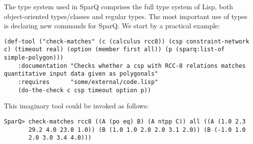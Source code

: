 \documentclass[headsepline]{scrreprt}
\theoremstyle{definition}
\newcommand{\engine}{SparQ}
\begin{document}
The type system used in \engine{} comprises the full type system of Lisp, both object-oriented types/classes and regular types. The most important use of types is declaring new commands for \engine{}. We start by a practical example:

\begin{lstlisting}
(def-tool ("check-matches" (c (calculus rcc8)) (csp constraint-network c) (timeout real) (option (member first all)) (p (sparq:list-of simple-polygon)))
    :documentation "Checks whether a csp with RCC-8 relations matches quantitative input data given as polygonals"
    :requires      "some/external/code.lisp"
    (do-the-check c csp timeout option p))
\end{lstlisting}

This imaginary tool could be invoked as follows:
\begin{verbatim}
SparQ> check-matches rcc8 ((A (po eq) B) (A ntpp C)) all ((A (1.0 2.3 
       29.2 4.0 23.0 1.0)) (B (1.0 1.0 2.0 2.0 3.1 2.0)) (B (-1.0 1.0 
       2.0 3.0 3.4 4.0)))
\end{verbatim}
\end{document}
